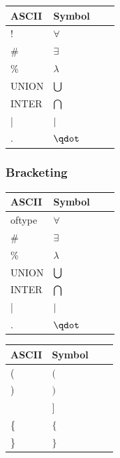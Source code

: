 \begin{center}
    \begin{tabular}{ | l | l | l | p{5cm} |}
    \hline
	ASCII & Symbol \\ \hline
	! & $\forall$ \\ \hline
	\# & $\exists$ \\ \hline
	\% & $\lambda$ \\ \hline
	UNION & $\bigcup\nolimits$ \\ \hline
	INTER & $\bigcap\nolimits$ \\ \hline
	| & $|$ \\ \hline
	. & $\qdot$ \\ \hline
    \end{tabular}
\end{center}

\subsubsection{Bracketing}

\begin{center}
    \begin{tabular}{ | l | l | l | p{5cm} |}
    \hline
	ASCII & Symbol \\ \hline
	oftype & $\forall$ \\ \hline
	\# & $\exists$ \\ \hline
	\% & $\lambda$ \\ \hline
	UNION & $\bigcup\nolimits$ \\ \hline
	INTER & $\bigcap\nolimits$ \\ \hline
	| & $|$ \\ \hline
	. & $\qdot$ \\ \hline
    \end{tabular}
\end{center}

\begin{center}
    \begin{tabular}{ | l | l | l | p{5cm} |}
    \hline
	ASCII & Symbol \\ \hline
	( & $($ \\ \hline
	) & $)$ \\ \hline
	[ & $[$ \\ \hline
	] & $]$ \\ \hline
	\{ & $\{$ \\ \hline
	\} & $\}$ \\ \hline
    \end{tabular}
\end{center}

